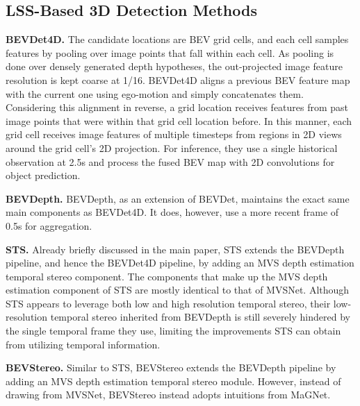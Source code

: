 \documentclass[runningheads, hyperfootnotes=false]{article}
\begin{document}
\subsection{LSS-Based 3D Detection Methods}
\noindent\textbf{BEVDet4D.} The candidate locations are BEV grid cells, and each cell samples features by pooling over  image points that fall within each cell. As pooling is done over densely generated depth hypotheses, the out-projected image feature resolution is kept coarse at 1/16. BEVDet4D aligns a previous BEV feature map with the current one using ego-motion and simply concatenates them. Considering this alignment in reverse, a grid location receives features from  past image points that were within that grid cell location before. In this manner, each grid cell receives image features of multiple timesteps from regions in 2D views around the grid cell's 2D projection. For inference, they use a single historical observation at 2.5s and process the fused BEV map with 2D convolutions for object prediction. 

\noindent\textbf{BEVDepth.} BEVDepth, as an extension of BEVDet, maintains the exact same main components as BEVDet4D. It does, however, use a more recent frame of 0.5s for aggregation.

\noindent\textbf{STS.} Already briefly discussed in the main paper, STS extends the BEVDepth pipeline, and hence the BEVDet4D pipeline, by adding an MVS depth estimation temporal stereo component. The components that make up the MVS depth estimation component of STS are mostly identical to that of MVSNet. Although STS appears to leverage both low and high resolution temporal stereo, their low-resolution temporal stereo inherited from BEVDepth is still severely hindered by the single temporal frame they use, limiting the improvements STS can obtain from utilizing temporal information.

\noindent\textbf{BEVStereo.} Similar to STS, BEVStereo extends the BEVDepth pipeline by adding an MVS depth estimation temporal stereo module. However, instead of drawing from MVSNet, BEVStereo instead adopts intuitions from MaGNet.
\end{document}
